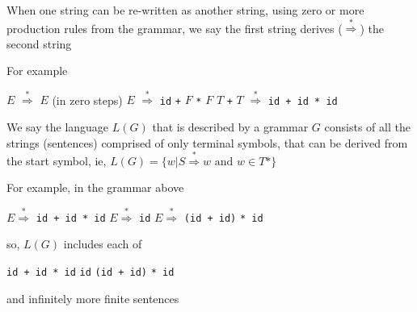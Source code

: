\documentclass[8pt,a4paper,compress,handout]{beamer}
\newcommand{\mm}[1]{$#1$}
\newcommand{\derives}{\stackrel{*}{\Rightarrow}}
\newenvironment{spaced}
{
\smallskip
\hspace{.5cm}
\begin{minipage}[c]{\textwidth}
}
{
\end{minipage}
\smallskip
}
\begin{document}
\begin{frame}[fragile]
\pause

When one string can be re-written as another string, using zero or more production rules from the grammar, we say the first string derives ($\derives$) the second string

\pause
\bigskip
 
For example

\text{ }
\begin{spaced}
\begin{production}
\mm{E} \mm{\derives} \mm{E} (in zero steps)
\mm{E} \mm{\derives} \lstinline{id} \lstinline{+} \mm{F} \lstinline{*} \mm{F}
\mm{T} \lstinline{+} \mm{T} \mm{\derives}  \lstinline{id + id * id}
\end{production}
\end{spaced}

\pause
\bigskip

We say the language $L(G)$ that is described by a grammar $G$ consists of all the strings (sentences) comprised of only terminal symbols, that can be derived from the start symbol, ie, $L(G) = \{w | S \derives w \text{ and } w \in T*\}$

\pause
\bigskip

For example, in the grammar above

\text{ }
\begin{spaced}
\begin{production}
\mm{E \derives} \lstinline{id + id * id}
\mm{E \derives} \lstinline{id}
\mm{E \derives} \lstinline{(id + id)} \lstinline{* id}
\end{production}
\end{spaced}

\noindent so,  $L(G)$ includes each of

\text{ }
\begin{spaced}
\begin{production}
\lstinline{id + id * id}
\lstinline{id}
\lstinline{(id + id)} \lstinline{* id}
\end{production}
\end{spaced}

\noindent and infinitely more finite sentences
\end{frame}
\end{document}
